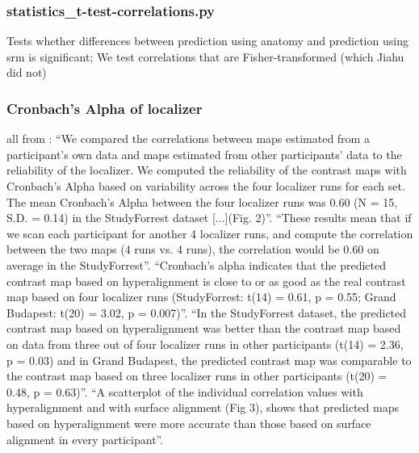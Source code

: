 


\subsubsection{statistics\_t-test-correlations.py}

Tests whether differences between prediction using anatomy and prediction using
\ac{srm} is significant;
%
We test correlations that are Fisher-transformed (which Jiahu did not)


\subsubsection{Cronbach's Alpha of localizer}



all from \citep{jiahui2020predicting}: ``We compared the correlations between
maps estimated from a participant's own data and maps estimated from other
participants' data to the reliability of the localizer. We computed the
reliability of the contrast maps with Cronbach's Alpha based on variability
across the four localizer runs for each set. The mean Cronbach's Alpha between
the four localizer runs was 0.60 (N = 15, S.D. = 0.14) in the StudyForrest
dataset [...](Fig. 2)''.
%
``These results mean that if we scan each participant for another 4 localizer
runs, and compute the correlation between the two maps (4 runs vs. 4 runs), the
correlation would be 0.60 on average in the StudyForrest''.
%
``Cronbach's alpha indicates that the predicted contrast map based on
hyperalignment is close to or as good as the real contrast map based on four
localizer runs (StudyForrest: t(14) = 0.61, p = 0.55; Grand Budapest: t(20) =
3.02, p = 0.007)''.
%
``In the StudyForrest dataset, the predicted contrast map based on
hyperalignment was better than the contrast map based on data from three out of
four localizer runs in other participants (t(14) = 2.36, p = 0.03) and in Grand
Budapest, the predicted contrast map was comparable to the contrast map based on
three localizer runs in other participants (t(20) = 0.48, p = 0.63)''.
%
``A scatterplot of the individual correlation values with hyperalignment and
with surface alignment (Fig 3), shows that predicted maps based on
hyperalignment were more accurate than those based on surface alignment in every
participant''.


